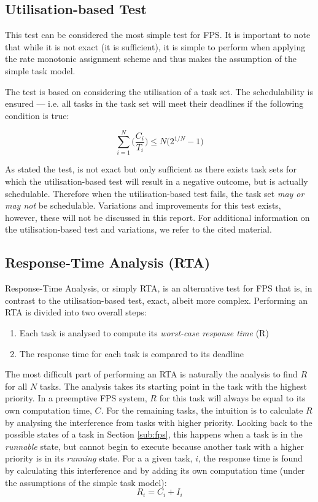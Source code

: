 \subsection{Utilisation-based Test} %
\label{sub:utilization_based_test}
This test can be considered the most simple test for FPS. It is important to note that while it is not exact (it is sufficient), it is simple to perform when applying the rate monotonic assignment scheme and thus makes the assumption of the simple task model.

The test is based on considering the utilisation of a task set. The schedulability is ensured --- i.e. all tasks in the task set will meet their deadlines if the following condition is true:

\begin{equation}
	\sum_{i=1}^N \biggl(\frac{C_i}{T_i}\biggr) \le N\bigl( 2^{1/N} - 1 \bigr)
\end{equation}

As stated the test, is not exact but only sufficient as there exists task sets for which the utilisation-based test will result in a negative outcome, but is actually schedulable. Therefore when the utilisation-based test fails, the task set \textit{may or may not} be schedulable. Variations and improvements for this test exists, however, these will not be discussed in this report. For additional information on the utilisation-based test and variations, we refer to the cited material.


\subsection{Response-Time Analysis (RTA)} %
\label{sub:response_time_analysis_}
Response-Time Analysis, or simply RTA, is an alternative test for FPS that is, in contrast to the utilisation-based test, exact, albeit more complex. Performing an RTA is divided into two overall steps:
\begin{enumerate}
\item Each task is analysed to compute its \textit{worst-case response time} (R)
\item The response time for each task is compared to its deadline
\end{enumerate}
The most difficult part of performing an RTA is naturally the analysis to find $R$ for all $N$ tasks. The analysis takes its starting point in the task with the highest priority. In a preemptive FPS system, $R$ for this task will always be equal to its own computation time, $C$. For the remaining tasks, the intuition is to calculate $R$ by analysing the interference from tasks with higher priority. Looking back to the possible states of a task in Section \ref{sub:fps}, this happens when a task is in the \textit{runnable} state, but cannot begin to execute because another task with a higher priority is in its \textit{running} state. For a a given task, $i$, the response time is found by calculating this interference and by adding its own computation time (under the assumptions of the simple task model):
\begin{equation}
	R_i = C_i + I_i
\end{equation}

